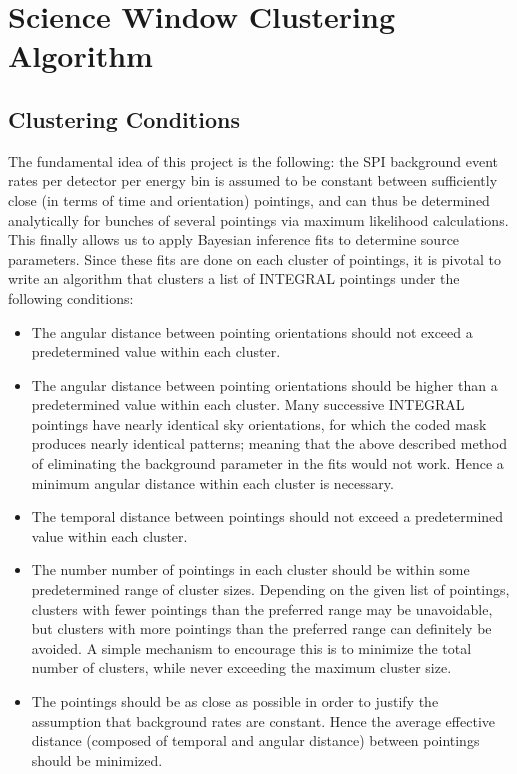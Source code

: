 \documentclass{report}
\begin{document}
\chapter{Science Window Clustering Algorithm}
\label{Clustering Algorithm}
\section{Clustering Conditions} \label{list:conditions}
The fundamental idea of this project is the following: the SPI background event rates per detector per energy bin
is assumed to be constant between sufficiently close (in terms of time and orientation) pointings, and can thus be
determined analytically for bunches of several pointings via maximum likelihood calculations. This finally allows us to
apply Bayesian inference fits to determine source parameters. Since these fits are done on each cluster of pointings,
it is pivotal to write an algorithm that clusters a list of INTEGRAL pointings under the following conditions:
\begin{itemize}
    \item The angular distance between pointing orientations should not exceed a predetermined value within each
    cluster.
    \item The angular distance between pointing orientations should be higher than a predetermined value within each
    cluster. Many successive INTEGRAL pointings have nearly identical sky orientations, for which the coded mask
    produces nearly identical patterns; meaning that the above described method of eliminating the background parameter
    in the fits would not work. Hence a minimum angular distance within each cluster is necessary.
    \item The temporal distance between pointings should not exceed a predetermined value within each cluster.
    \item The number number of pointings in each cluster should be within some predetermined range of cluster sizes.
    Depending on the given list of pointings, clusters with fewer pointings than the preferred range may be
    unavoidable, but clusters with more pointings than the preferred range can definitely be avoided. A simple
    mechanism to encourage this is to minimize the total number of clusters, while never exceeding the maximum cluster
    size.
    \item The pointings should be as close as possible in order to justify the assumption that background rates are
    constant. Hence the average effective distance (composed of temporal and angular distance) between pointings should
    be minimized.
\end{itemize}
\end{document}
